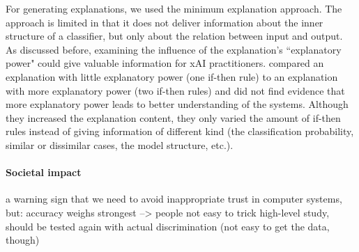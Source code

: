 For generating explanations, we used the minimum explanation approach. The approach is limited in that it does not deliver information about the inner structure of a classifier, but only about the relation between input and output. As discussed before, examining the influence of the explanation's ``explanatory power" could give valuable information for xAI practitioners. \cite{ribeiro2018anchors} compared an explanation with little explanatory power (one if-then rule) to an explanation with more explanatory power (two if-then rules) and did not find evidence that more explanatory power leads to better understanding of the systems. Although they increased the explanation content, they only varied the amount of if-then rules instead of giving information of different kind (the classification probability, similar or dissimilar cases, the model structure, etc.).\newline

\paragraph{Societal impact}
a warning sign that we need to avoid inappropriate trust in computer systems, but:
accuracy weighs strongest --> people not easy to trick
high-level study, should be tested again with actual discrimination (not easy to get the data, though)

